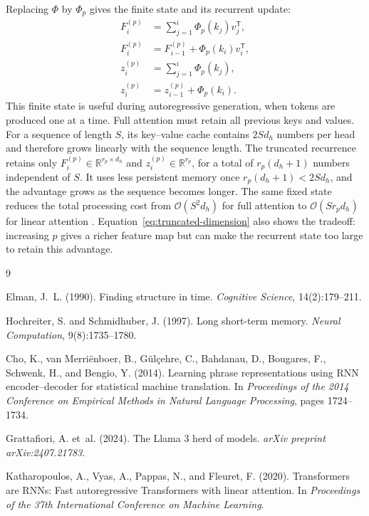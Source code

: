 \documentclass[11pt]{article}
\newcommand{\R}{\mathbb{R}}
\begin{document}
Replacing $\Phi$ by $\Phi_p$ gives the finite state and its recurrent update:
\begin{equation}
  \begin{split}
    F_i^{(p)}&=\sum_{j=1}^{i}\Phi_p(k_j)v_j^{\mathsf T},\\
    F_i^{(p)}&=F_{i-1}^{(p)}+\Phi_p(k_i)v_i^{\mathsf T},\\
    z_i^{(p)}&=\sum_{j=1}^{i}\Phi_p(k_j),\\
    z_i^{(p)}&=z_{i-1}^{(p)}+\Phi_p(k_i).
  \label{eq:finite-state}
  \end{split}
\end{equation}
This finite state is useful during autoregressive generation, when tokens are
produced one at a time.  Full attention must retain all previous keys and
values.  For a sequence of length $S$, its key--value cache contains
$2Sd_h$ numbers per head and therefore grows linearly with the sequence length.
The truncated recurrence retains only
$F_i^{(p)}\in\R^{r_p\times d_h}$ and $z_i^{(p)}\in\R^{r_p}$, for a total of
$r_p(d_h+1)$ numbers independent of $S$.  It uses less persistent memory once
$r_p(d_h+1)<2Sd_h$, and the advantage grows as the sequence becomes longer.
The same fixed state reduces the total processing cost from
$\mathcal{O}(S^2d_h)$ for full attention to $\mathcal{O}(Sr_pd_h)$ for linear
attention \citep{katharopoulos2020transformers}.  Equation~\eqref{eq:truncated-dimension}
also shows the tradeoff: increasing $p$ gives a richer feature map but can make
the recurrent state too large to retain this advantage.

{\small
\setlength{\parskip}{0pt}
\begin{thebibliography}{9}

Elman, J.~L. (1990).
\newblock Finding structure in time.
\newblock \emph{Cognitive Science}, 14(2):179--211.

Hochreiter, S. and Schmidhuber, J. (1997).
\newblock Long short-term memory.
\newblock \emph{Neural Computation}, 9(8):1735--1780.

Cho, K., van Merri\"enboer, B., G\"ul\c{c}ehre, C., Bahdanau, D., Bougares, F.,
Schwenk, H., and Bengio, Y. (2014).
\newblock Learning phrase representations using RNN encoder--decoder for
statistical machine translation.
\newblock In \emph{Proceedings of the 2014 Conference on Empirical Methods in
Natural Language Processing}, pages 1724--1734.

Grattafiori, A. et~al. (2024).
\newblock The Llama 3 herd of models.
\newblock \emph{arXiv preprint arXiv:2407.21783}.

Katharopoulos, A., Vyas, A., Pappas, N., and Fleuret, F. (2020).
\newblock Transformers are RNNs: Fast autoregressive Transformers with linear
attention.
\newblock In \emph{Proceedings of the 37th International Conference on Machine
Learning}.

\end{thebibliography}
}
\end{document}
